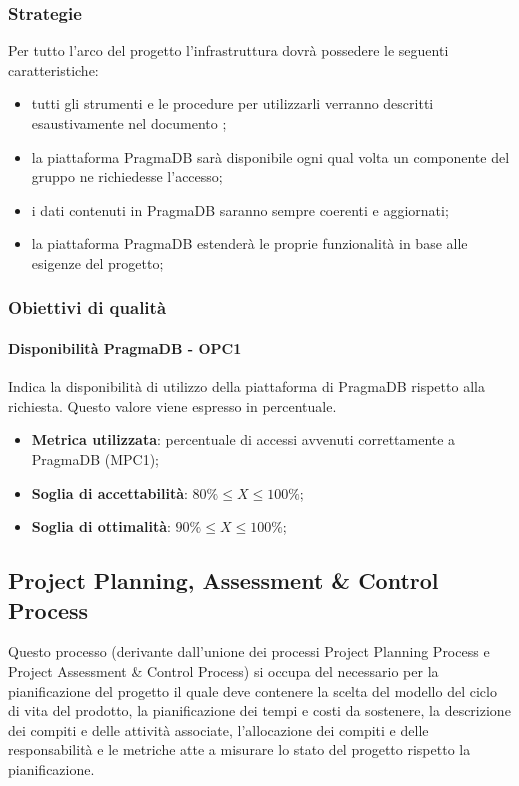 \documentclass[PianoDiQualifica.tex]{subfiles}
\begin{document}
		\subsubsection{Strategie}
		Per tutto l'arco del progetto l'infrastruttura dovrà possedere le seguenti caratteristiche:
		\begin{itemize}
			\item tutti gli strumenti e le procedure per utilizzarli verranno descritti esaustivamente nel documento \NPdocRP{};
			\item la piattaforma PragmaDB sarà disponibile ogni qual volta un componente del gruppo ne richiedesse l'accesso;
			\item i dati contenuti in PragmaDB saranno sempre coerenti e aggiornati;
			\item la piattaforma PragmaDB estenderà le proprie funzionalità in base alle esigenze del progetto;
		\end{itemize}
	
		\subsubsection{Obiettivi di qualità}
			\paragraph{Disponibilità PragmaDB - OPC1}
				Indica la disponibilità di utilizzo della piattaforma di PragmaDB rispetto alla richiesta. Questo valore viene espresso in percentuale.
				\begin{itemize}
					\item \textbf{Metrica utilizzata}: percentuale di accessi avvenuti correttamente a PragmaDB (MPC1);
					\item \textbf{Soglia di accettabilità}: \begin{math}80\% \leq X \leq 100\%\end{math};
					\item \textbf{Soglia di ottimalità}: \begin{math}90\% \leq X \leq 100\%\end{math};
				\end{itemize}
		
	\subsection{Project Planning, Assessment \& Control Process}
		Questo processo (derivante dall’unione dei processi Project Planning Process e Project Assessment
		\& Control Process) si occupa del necessario per la pianificazione del progetto il quale deve
		contenere la scelta del modello del ciclo di vita del prodotto, la pianificazione dei tempi e costi da
		sostenere, la descrizione dei compiti e delle attività associate, l'allocazione dei compiti e delle
		responsabilità e le metriche atte a misurare lo stato del progetto rispetto la pianificazione.
		
\end{document}
